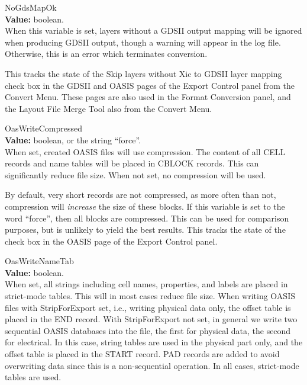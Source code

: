 \begin{description}
\item{\et NoGdsMapOk}\\
{\bf Value:} boolean.\\
When this variable is set, layers without a GDSII output mapping will
be ignored when producing GDSII output, though a warning will appear
in the log file.  Otherwise, this is an error which terminates
conversion.

This tracks the state of the {\cb Skip layers without Xic to GDSII
layer mapping} check box in the {\cb GDSII} and {\cb OASIS} pages of
the {\cb Export Control} panel from the {\cb Convert Menu}.  These
pages are also used in the {\cb Format Conversion} panel, and the {\cb
Layout File Merge Tool} also from the {\cb Convert Menu}.

\item{\et OasWriteCompressed}\\
{\bf Value:} boolean, or the string ``{\vt force}''.\\
When set, created OASIS files will use compression.  The content of
all CELL records and name tables will be placed in CBLOCK records. 
This can significantly reduce file size.  When not set, no compression
will be used.

By default, very short records are not compressed, as more often than
not, compression will {\it increase} the size of these blocks.  If
this variable is set to the word ``{\vt force}'', then all blocks are
compressed.  This can be used for comparison purposes, but is unlikely
to yield the best results.  This tracks the state of the check box in
the {\cb OASIS} page of the {\cb Export Control} panel.

\item{\et OasWriteNameTab}\\
{\bf Value:} boolean.\\
When set, all strings including cell names, properties, and labels are
placed in strict-mode tables.  This will in most cases reduce file
size.  When writing OASIS files with {\et StripForExport} set, i.e.,
writing physical data only, the offset table is placed in the END
record.  With {\et StripForExport} not set, in general we write two
sequential OASIS databases into the file, the first for physical data,
the second for electrical.  In this case, string tables are used in
the physical part only, and the offset table is placed in the START
record.  PAD records are added to avoid overwriting data since this is
a non-sequential operation.  In all cases, strict-mode tables are
used.


\end{description}
